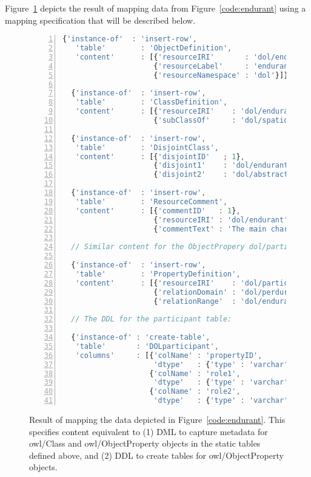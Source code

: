 \documentclass[9pt,letterpaper]{article}
\begin{document}
Figure~\ref{code:dynamic-ddl-dml} depicts the result of mapping data from Figure~\ref{code:endurant} using a mapping
specification that will be described below.

\begin{figure}[H]
  \caption{Result of mapping the data depicted in Figure~\ref{code:endurant}.
    This specifies content equivalent to
    (1) DML to capture metadata for owl/Class and owl/ObjectProperty objects in the static tables defined above, and
    (2) DDL to create tables for owl/ObjectProperty objects.}
  \label{code:dynamic-ddl-dml}
\begin{lstlisting}[language=JavaScript,numberstyle=\scriptsize,basicstyle=\ttfamily\scriptsize,numbers=left,stepnumber=1,breaklines=true]
  {'instance-of'  : 'insert-row',
   'table'        : 'ObjectDefinition',
   'content'      : [{'resourceIRI'       : 'dol/endurant'},
                     {'resourceLabel'     : 'endurant'},
                     {'resourceNamespace' : 'dol'}]}

  {'instance-of'  : 'insert-row',
   'table'        : 'ClassDefinition',
   'content'      : [{'resourceIRI'    : 'dol/endurant'},
                     {'subClassOf'     : 'dol/spatio-temporal-particular'}]}

  {'instance-of'  : 'insert-row',
   'table'        : 'DisjointClass',
   'content'      : [{'disjointID'   ; 1},
                     {'disjoint1'    : 'dol/endurant'},
                     {'disjoint2'    : 'dol/abstract'}]} // ... (Two more disjoints elided.)

  {'instance-of'  : 'insert-row',
   'table'        : 'ResourceComment',
   'content'      : [{'commentID'   : 1},
                     {'resourceIRI' : 'dol/endurant'},
                     {'commentText' : 'The main characteristic of endurants is...'}]}

  // Similar content for the ObjectPropery dol/participant is elided.

  {'instance-of'  : 'insert-row',
   'table'        : 'PropertyDefinition',
   'content'      : [{'resourceIRI'    : 'dol/participant'},
                     {'relationDomain' : 'dol/perdurant'},
                     {'relationRange'  : 'dol/endurant'}]}

  // The DDL for the participant table:

  {'instance-of' : 'create-table',
   'table'       : 'DOLparticipant',
   'columns'     : [{'colName' : 'propertyID',
                     'dtype'   : {'type' : 'varchar', 'size' : 300, 'key' : 'primary'}},
                    {'colName' : 'role1',
                     'dtype'   : {'type' : 'varchar', 'size' : 300, 'ref' : 'ObjectDefinition'}},
                    {'colName' : 'role2',
                     'dtype'   : {'type' : 'varchar', 'size' : 300, 'ref' : 'ObjectDefinition'}}]}
\end{lstlisting}
\end{figure}
\end{document}
